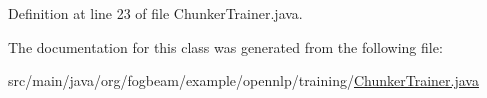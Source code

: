 Definition at line 23 of file Chunker\+Trainer.\+java.



The documentation for this class was generated from the following file\+:\begin{DoxyCompactItemize}
\item 
src/main/java/org/fogbeam/example/opennlp/training/\hyperlink{_chunker_trainer_8java}{Chunker\+Trainer.\+java}\end{DoxyCompactItemize}
